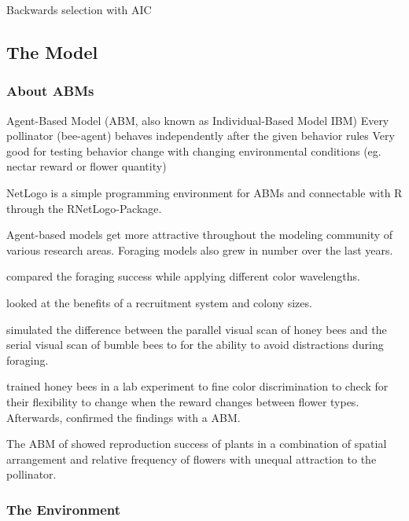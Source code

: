 Backwards selection with AIC




\newpage


\subsection{The Model}


\subsubsection{About ABMs}
Agent-Based Model (ABM, also known as Individual-Based Model IBM)
Every pollinator (bee-agent) behaves independently after the given behavior rules
Very good for testing behavior change with changing environmental conditions (eg. nectar reward or flower quantity)


NetLogo \citep{wilensky1999netlogo} is a simple programming environment for ABMs and  connectable with R through the RNetLogo-Package.

Agent-based models get more attractive throughout the modeling community of various research areas. Foraging models also grew in number over the last years.

\citet{faruq2013biological} compared the foraging success while applying different color wavelengths.

\citet{dornhaus2006benefits} looked at the benefits of a recruitment system and colony sizes.
 
\citet{bukovac2013bees} simulated the difference between the parallel visual scan of honey bees and the serial visual scan of bumble bees to for the ability to avoid distractions during foraging. 

\citet{dyer2014bee} trained honey bees in a lab experiment to fine color discrimination to check for their flexibility to change when the reward changes between flower types. Afterwards,  \citet{dyer2014bee} confirmed the findings with a ABM. 

The ABM of \citet{hanoteaux2013effects} showed reproduction success of plants in a combination of spatial arrangement and relative frequency of flowers with unequal attraction to the pollinator. 



\subsubsection{The Environment}

